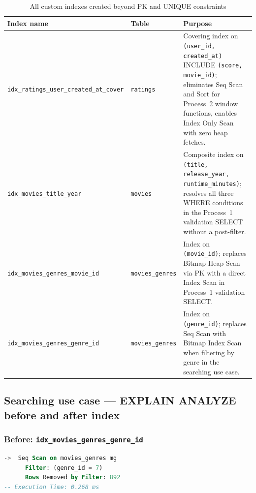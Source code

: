 \documentclass[11pt, a4paper]{article}
\begin{document}
\begin{table}[H]
    \centering
    \small
    \renewcommand{\arraystretch}{1.2}
    \caption{All custom indexes created beyond PK and UNIQUE constraints}
    \label{tab:indexes}
    \begin{tabularx}{\textwidth}{l l X}
        \toprule
        \textbf{Index name} & \textbf{Table} & \textbf{Purpose} \\
        \midrule
        \texttt{idx\_ratings\_user\_created\_at\_cover}
            & \texttt{ratings}
            & Covering index on \texttt{(user\_id, created\_at)} INCLUDE \texttt{(score, movie\_id)}; eliminates Seq Scan and Sort for Process~2 window functions, enables Index Only Scan with zero heap fetches. \\[2pt]
        \texttt{idx\_movies\_title\_year}
            & \texttt{movies}
            & Composite index on \texttt{(title, release\_year, runtime\_minutes)}; resolves all three WHERE conditions in the Process~1 validation SELECT without a post-filter. \\[2pt]
        \texttt{idx\_movies\_genres\_movie\_id}
            & \texttt{movies\_genres}
            & Index on \texttt{(movie\_id)}; replaces Bitmap Heap Scan via PK with a direct Index Scan in Process~1 validation SELECT. \\[2pt]
        \texttt{idx\_movies\_genres\_genre\_id}
            & \texttt{movies\_genres}
            & Index on \texttt{(genre\_id)}; replaces Seq Scan with Bitmap Index Scan when filtering by genre in the searching use case. \\
        \bottomrule
    \end{tabularx}
\end{table}

\subsection{Searching use case --- EXPLAIN ANALYZE before and after index}

\subsubsection*{Before: \texttt{idx\_movies\_genres\_genre\_id}}

\begin{lstlisting}[language=SQL, caption={Before index --- genre filter on movies\_genres}]
->  Seq Scan on movies_genres mg
      Filter: (genre_id = 7)
      Rows Removed by Filter: 892
-- Execution Time: 0.268 ms
\end{lstlisting}
\end{document}
